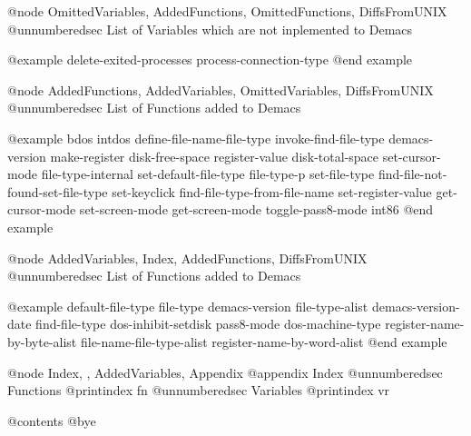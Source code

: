 @node OmittedVariables, AddedFunctions, OmittedFunctions, DiffsFromUNIX
@unnumberedsec List of Variables which are not inplemented to Demacs

@example
delete-exited-processes                 process-connection-type
@end example


@node AddedFunctions, AddedVariables, OmittedVariables, DiffsFromUNIX
@unnumberedsec List of Functions added to Demacs

@example
bdos                                    intdos
define-file-name-file-type              invoke-find-file-type
demacs-version                          make-register
disk-free-space                         register-value
disk-total-space                        set-cursor-mode
file-type-internal                      set-default-file-type
file-type-p                             set-file-type
find-file-not-found-set-file-type       set-keyclick
find-file-type-from-file-name           set-register-value
get-cursor-mode                         set-screen-mode
get-screen-mode                         toggle-pass8-mode
int86
@end example


@node AddedVariables, Index, AddedFunctions, DiffsFromUNIX
@unnumberedsec List of Functions added to Demacs

@example
default-file-type                       file-type
demacs-version                          file-type-alist
demacs-version-date                     find-file-type
dos-inhibit-setdisk                     pass8-mode
dos-machine-type                        register-name-by-byte-alist
file-name-file-type-alist               register-name-by-word-alist
@end example


@node Index, , AddedVariables, Appendix
@appendix Index
@unnumberedsec Functions
@printindex fn
@unnumberedsec Variables
@printindex vr

@contents
@bye
